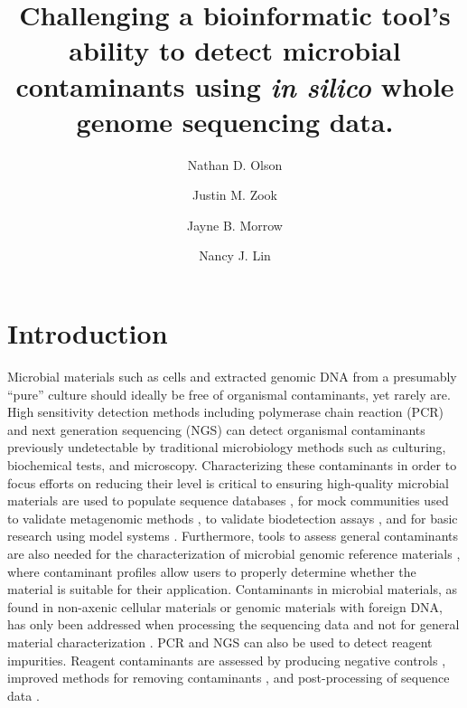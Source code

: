 \documentclass[fleqn,10pt,lineno]{wlpeerj}\usepackage[]{graphicx}\usepackage[]{color}
\title{Challenging a bioinformatic tool's ability to detect microbial contaminants using \textit{in silico} whole genome sequencing data.}
\author[1]{Nathan D. Olson}
\author[1]{Justin M. Zook}
\author[1]{Jayne B. Morrow}
\author[1]{Nancy J. Lin}
\affil[1]{Material Measurement Laboratory, National Institute of Standards and Technology}
\begin{document}
\flushbottom
\maketitle
\thispagestyle{empty}

\section*{Introduction} 
Microbial materials such as cells and extracted genomic DNA from a presumably “pure” culture should ideally be free of organismal contaminants, yet rarely are. 
High sensitivity detection methods including polymerase chain reaction (PCR) and next generation sequencing (NGS) can detect organismal contaminants previously undetectable by traditional microbiology methods such as culturing, biochemical tests, and microscopy. 
Characterizing these contaminants in order to focus efforts on reducing their level is critical to ensuring high-quality microbial materials are used to populate sequence databases \citep{parks2015checkm}, for mock communities used to validate metagenomic methods \citep{bokulich2016mockrobiota}, to validate biodetection assays  \citep{Ieven2013,International2011}, and for basic research using model systems \citep{Shrestha2013}. 
Furthermore, tools to assess general contaminants are also needed for the characterization of microbial genomic reference materials \citep{olson2016pepr}, where contaminant profiles allow users to properly determine whether the material is suitable for their application. 
Contaminants in microbial materials, as found in non-axenic cellular materials or genomic materials with foreign DNA, has only been addressed when processing the sequencing data and not for general material characterization \citep{Shrestha2013,tennessen2015prodege}.
PCR and NGS can also be used to detect reagent impurities. 
Reagent contaminants are assessed by producing   negative controls \citep{jervis2015deriving}, improved methods for removing contaminants \citep{woyke2011decontamination,motley2014improved}, and post-processing of sequence data \citep{mukherjee2015large}. 
\end{document}
